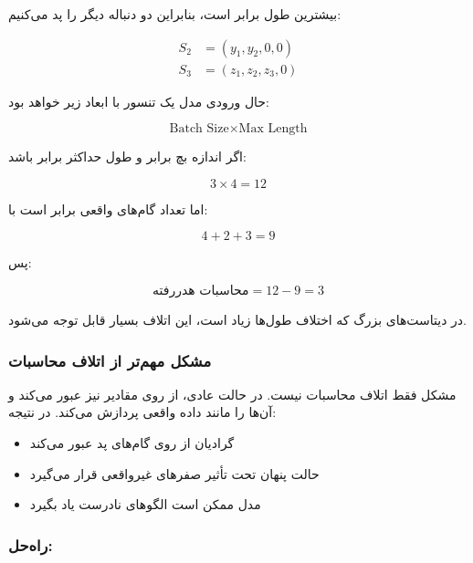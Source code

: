 \documentclass{article}
\begin{document}
بیشترین طول برابر  است، بنابراین دو دنباله دیگر را پد می‌کنیم:

\begin{align}
	S_2 &= (y_1, y_2, 0, 0) \\
	S_3 &= (z_1, z_2, z_3, 0)
\end{align}

حال ورودی مدل یک تنسور با ابعاد زیر خواهد بود:

\begin{equation}
	\text{Batch Size} \times \text{Max Length}
\end{equation}

اگر اندازه بچ برابر  و طول حداکثر برابر  باشد:

\begin{equation}
	3 \times 4 = 12
\end{equation}

اما تعداد گام‌های واقعی برابر است با:

\begin{equation}
	4 + 2 + 3 = 9
\end{equation}

پس:

\begin{equation}
	\text{محاسبات هدررفته} = 12 - 9 = 3
\end{equation}

در دیتاست‌های بزرگ که اختلاف طول‌ها زیاد است، این اتلاف بسیار قابل توجه می‌شود.

\subsubsection{مشکل مهم‌تر از اتلاف محاسبات}

مشکل فقط اتلاف محاسبات نیست. 
در حالت عادی،  از روی مقادیر  نیز عبور می‌کند و آن‌ها را مانند داده واقعی پردازش می‌کند. 
در نتیجه:

\begin{itemize}
	\item گرادیان از روی گام‌های پد عبور می‌کند
	\item حالت پنهان تحت تأثیر صفرهای غیرواقعی قرار می‌گیرد
	\item مدل ممکن است الگوهای نادرست یاد بگیرد
\end{itemize}

\subsubsection{راه‌حل: }
\end{document}
